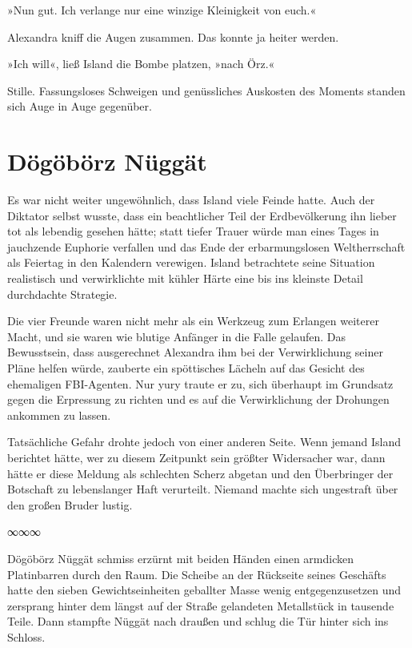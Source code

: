 »Nun gut. Ich verlange nur eine winzige Kleinigkeit von euch.«

Alexandra kniff die Augen zusammen. Das konnte ja heiter werden.

»Ich will«, ließ Island die Bombe platzen, »nach Örz.«

Stille. Fassungsloses Schweigen und genüssliches Auskosten des Moments standen sich Auge in Auge gegenüber.

\chapter{Dögöbörz Nüggät}

Es war nicht weiter ungewöhnlich, dass Island viele Feinde hatte. Auch der Diktator selbst wusste, dass ein beachtlicher Teil der Erdbevölkerung ihn lieber tot als lebendig gesehen hätte; statt tiefer Trauer würde man eines Tages in jauchzende Euphorie verfallen und das Ende der erbarmungslosen Weltherrschaft als Feiertag in den Kalendern verewigen. Island betrachtete seine Situation realistisch und verwirklichte mit kühler Härte eine bis ins kleinste Detail durchdachte Strategie.

Die vier Freunde waren nicht mehr als ein Werkzeug zum Erlangen weiterer Macht, und sie waren wie blutige Anfänger in die Falle gelaufen. Das Bewusstsein, dass ausgerechnet Alexandra ihm bei der Verwirklichung seiner Pläne helfen würde, zauberte ein spöttisches Lächeln auf das Gesicht des ehemaligen FBI-Agenten. Nur yury traute er zu, sich überhaupt im Grundsatz gegen die Erpressung zu richten und es auf die Verwirklichung der Drohungen ankommen zu lassen.

Tatsächliche Gefahr drohte jedoch von einer anderen Seite. Wenn jemand Island berichtet hätte, wer zu diesem Zeitpunkt sein größter Widersacher war, dann hätte er diese Meldung als schlechten Scherz abgetan und den Überbringer der Botschaft zu lebenslanger Haft verurteilt. Niemand machte sich ungestraft über den großen Bruder lustig.

\begin{center}
∞∞∞
\end{center}

Dögöbörz Nüggät schmiss erzürnt mit beiden Händen einen armdicken Platinbarren durch den Raum. Die Scheibe an der Rückseite seines Geschäfts hatte den sieben Gewichtseinheiten geballter Masse wenig entgegenzusetzen und zersprang hinter dem längst auf der Straße gelandeten Metallstück in tausende Teile. Dann stampfte Nüggät nach draußen und schlug die Tür hinter sich ins Schloss.

